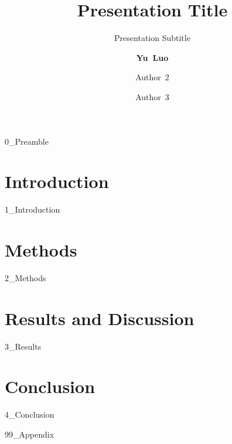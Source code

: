 \documentclass[mathserif,aspectratio=169
,handout %
]{beamer}
\title[Conference Name, Location] %
{{\bf Presentation Title}}
\subtitle{\footnotesize Presentation Subtitle}
\author[Luo, et al.] %
{{\bf Yu~Luo}\inst{1} 
\and Author~2\inst{2} \and Author~3\inst{1}\inst{2}
}
\institute[University of Delaware] %
{
  \inst{1}%
  Institution 1%
  \and
  \inst{2}%
  Institution 2%
}
\date[Date] %
{Conference Name \rule[-0.4ex]{0.2ex}{1.2em} 
Date \rule[-0.4ex]{0.2ex}{1.2em} 
Location}
\begin{document}
\frame{\titlepage}

{0_Preamble}
\placelogofalse %

\section{Introduction}
{1_Introduction}

\section{Methods}
{2_Methods}

\section{Results and Discussion}
{3_Results}

\section{Conclusion}
{4_Conclusion}

\placelogofalse
\appendix
{99_Appendix}
\end{document}
